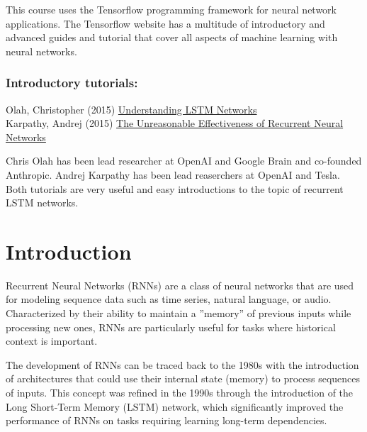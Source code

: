 This course uses the Tensorflow programming framework for neural network applications. The Tensorflow website has a multitude of introductory and advanced guides and tutorial that cover all aspects of machine learning with neural networks. 

\begin{tcolorbox}[colback=alert]
\subsubsection*{Introductory tutorials:}

Olah, Christopher (2015) \href{https://colah.github.io/posts/2015-08-Understanding-LSTMs/}{Understanding LSTM Networks} \\

Karpathy, Andrej (2015) \href{https://karpathy.github.io/2015/05/21/rnn-effectiveness/}{The Unreasonable Effectiveness of Recurrent Neural Networks}
\end{tcolorbox}

Chris Olah has been lead researcher at OpenAI and Google Brain and co-founded Anthropic. Andrej Karpathy has been lead reaserchers at OpenAI and Tesla. Both tutorials are very useful and easy introductions to the topic of recurrent LSTM networks.

\section{Introduction}

Recurrent Neural Networks (RNNs) are a class of neural networks that are used for modeling sequence data such as time series, natural language, or audio. Characterized by their ability to maintain a ''memory'' of previous inputs while processing new ones, RNNs are particularly useful for tasks where historical context is important.

The development of RNNs can be traced back to the 1980s with the introduction of architectures that could use their internal state (memory) to process sequences of inputs. This concept was refined in the 1990s through the introduction of the Long Short-Term Memory (LSTM) network, which significantly improved the performance of RNNs on tasks requiring learning long-term dependencies.

